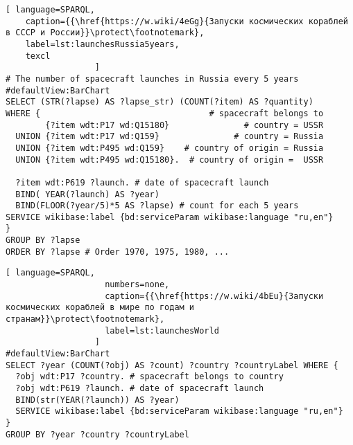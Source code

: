 \begin{lstlisting}[ language=SPARQL, 
    caption={{\href{https://w.wiki/4eGg}{Запуски космических кораблей в СССР и России}}\protect\footnotemark}, 
    label=lst:launchesRussia5years,
    texcl
                  ]
# The number of spacecraft launches in Russia every 5 years
#defaultView:BarChart
SELECT (STR(?lapse) AS ?lapse_str) (COUNT(?item) AS ?quantity)
WHERE {                                  # spacecraft belongs to
        {?item wdt:P17 wd:Q15180}               # country = USSR
  UNION {?item wdt:P17 wd:Q159}               # country = Russia
  UNION {?item wdt:P495 wd:Q159}    # country of origin = Russia
  UNION {?item wdt:P495 wd:Q15180}.  # country of origin =  USSR
  
  ?item wdt:P619 ?launch. # date of spacecraft launch
  BIND( YEAR(?launch) AS ?year) 
  BIND(FLOOR(?year/5)*5 AS ?lapse) # count for each 5 years
SERVICE wikibase:label {bd:serviceParam wikibase:language "ru,en"}
} 
GROUP BY ?lapse
ORDER BY ?lapse # Order 1970, 1975, 1980, ...
\end{lstlisting}



\begin{lstlisting}[ language=SPARQL, 
                    numbers=none, 
                    caption={{\href{https://w.wiki/4bEu}{Запуски космических кораблей в мире по годам и странам}}\protect\footnotemark}, 
                    label=lst:launchesWorld
                  ]
#defaultView:BarChart
SELECT ?year (COUNT(?obj) AS ?count) ?country ?countryLabel WHERE {
  ?obj wdt:P17 ?country. # spacecraft belongs to country 
  ?obj wdt:P619 ?launch. # date of spacecraft launch
  BIND(str(YEAR(?launch)) AS ?year)
  SERVICE wikibase:label {bd:serviceParam wikibase:language "ru,en"}
}
GROUP BY ?year ?country ?countryLabel
\end{lstlisting}




